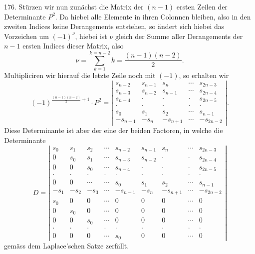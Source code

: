 \documentclass[11pt]{article}
\providecommand{\weberpage}[1]{}
\begin{document}
176. Stürzen wir nun zunächst die Matrix der $(n-1)$ ersten Zeilen der Determinante $P^2$. Da hiebei alle Elemente in ihren Colonnen bleiben, also in den zweiten Indices keine Derangements entstehen, so ändert sich hiebei das Vorzeichen um $(-1)^\nu$, hiebei ist $\nu$ gleich der Summe aller Derangements der $n-1$ ersten Indices dieser Matrix, also
\[
\nu = \sum_{k=1}^{k=n-2} k = \dfrac{(n-1)(n-2)}{2} .
\]
Multipliciren wir hierauf die letzte Zeile noch mit $(-1)$, so erhalten wir
\[
(-1)^{\frac{(n-1)(n-2)}{2}+1} \cdot P^2 =
\left|
\begin{array}{ccccc}
s_{n-2} & s_{n-1} & s_n & \cdots & s_{2n-3} \\
s_{n-3} & s_{n-2} & s_{n-1} & \cdots & s_{2n-4} \\
s_{n-4} & \cdot & \cdot & \cdot & s_{2n-5} \\
\cdot & \cdot & \cdot & \cdot & \cdot \\
s_0 & s_1 & s_2 & \cdots & s_{n-1} \\
-s_{n-1} & -s_n & -s_{n+1} & \cdots & -s_{2n-2}
\end{array}
\right| .
\]
Diese Determinante ist aber der eine der beiden Factoren, in welche die Determinante
\[
D =
\left|
\begin{array}{ccccccccc}
s_0 & s_1 & s_2 & \cdots & s_{n-2} & s_{n-1} & s_n & \cdots & s_{2n-3} \\
0 & s_0 & s_1 & \cdots & s_{n-3} & s_{n-2} & \cdot & \cdot & s_{2n-4} \\
0 & 0 & s_0 & \cdots & s_{n-4} & \cdot & \cdot & \cdot & s_{2n-5} \\
\cdot & \cdot & \cdot & \cdot & \cdot & \cdot & \cdot & \cdot & \cdot \\
0 & 0 & \cdots & \cdots & s_0 & s_1 & s_2 & \cdots & s_{n-1} \\
-s_1 & -s_2 & -s_3 & \cdots & -s_{n-1} & -s_n & -s_{n+1} & \cdots & -s_{2n-2} \\
s_0 & 0 & 0 & \cdots & 0 & 0 & 0 & \cdots & 0 \\
0 & s_0 & 0 & \cdots & 0 & 0 & 0 & \cdots & 0 \\
0 & 0 & s_0 & \cdots & 0 & 0 & 0 & \cdots & 0 \\
\cdot & \cdot & \cdot & \cdot & \cdot & \cdot & \cdot & \cdot & \cdot \\
0 & 0 & 0 & \cdots & s_0 & 0 & 0 & \cdots & 0
\end{array}
\right|
\]
gemäss dem Laplace'schen Satze zerfällt.


\weberpage{189}
\end{document}
